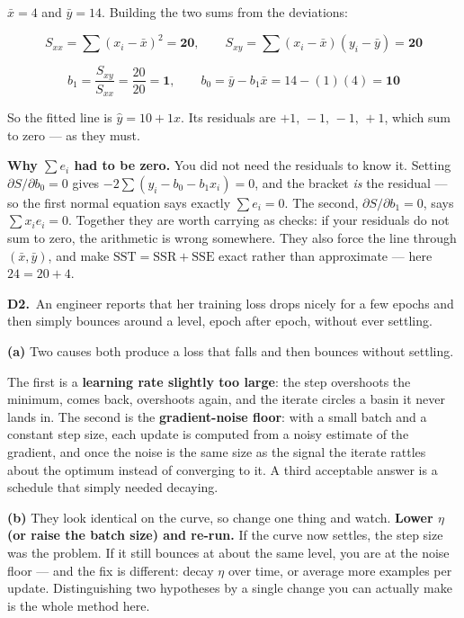 \documentclass[10pt,a4paper]{article}
\newcommand{\sol}[1]{\textbf{#1}}
\begin{document}
\vspace{2pt}

$\bar x = 4$ and $\bar y = 14$. Building the two sums from the deviations:

\[ S_{xx} = \sum (x_i-\bar x)^2 = \sol{20}, \qquad S_{xy} = \sum (x_i-\bar x)(y_i-\bar y) = \sol{20} \]

\[ b_1 = \frac{S_{xy}}{S_{xx}} = \frac{20}{20} = \sol{1}, \qquad b_0 = \bar y - b_1\bar x = 14 - (1)(4) = \sol{10} \]

So the fitted line is $\hat y = 10 + 1 x$. Its residuals are $+1,\,-1,\,-1,\,+1$, which sum to zero --- as they must.

\vspace{2pt}

\textbf{Why $\sum e_i$ had to be zero.} You did not need the residuals to know it. Setting $\partial S/\partial b_0 = 0$ gives $-2\sum(y_i - b_0 - b_1x_i) = 0$, and the bracket \emph{is} the residual --- so the first normal equation says exactly $\sum e_i = 0$. The second, $\partial S/\partial b_1 = 0$, says $\sum x_ie_i = 0$. Together they are worth carrying as checks: if your residuals do not sum to zero, the arithmetic is wrong somewhere. They also force the line through $(\bar x, \bar y)$, and make $\mathrm{SST} = \mathrm{SSR} + \mathrm{SSE}$ exact rather than approximate --- here $24 = 20 + 4$.

\vspace{6pt}

\textbf{D2.}\ An engineer reports that her training loss drops nicely for a few epochs and then simply bounces around a level, epoch after epoch, without ever settling.

\vspace{2pt}

\textbf{(a)} Two causes both produce a loss that falls and then bounces without settling.\par\vspace{1mm}The first is a \textbf{learning rate slightly too large}: the step overshoots the minimum, comes back, overshoots again, and the iterate circles a basin it never lands in. The second is the \textbf{gradient-noise floor}: with a small batch and a constant step size, each update is computed from a noisy estimate of the gradient, and once the noise is the same size as the signal the iterate rattles about the optimum instead of converging to it. A third acceptable answer is a schedule that simply needed decaying.\par\vspace{1mm}\textbf{(b)} They look identical on the curve, so change one thing and watch. \textbf{Lower $\eta$ (or raise the batch size) and re-run.} If the curve now settles, the step size was the problem. If it still bounces at about the same level, you are at the noise floor --- and the fix is different: decay $\eta$ over time, or average more examples per update. Distinguishing two hypotheses by a single change you can actually make is the whole method here.
\end{document}

